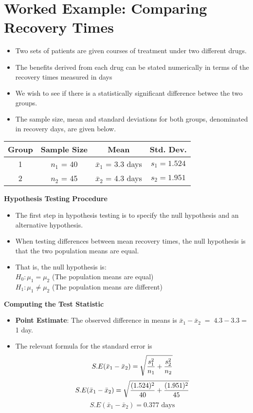 \documentclass[a4paper,12pt]{article}
\begin{document}
\section*{Worked Example: Comparing Recovery Times}
\begin{itemize}
\item Two sets of patients are given courses of treatment under two different drugs. \item 
The benefits
derived from each drug can be stated numerically in terms of the recovery times measured in days
\item We wish to see if there is a statistically significant difference betwee the two groups.
\item The sample size, mean and standard deviations for both groups, denominated in recovery days, are given below.
\end{itemize}
\begin{center}
 \begin{tabular}{|c|c|c|c|}
\hline Group & Sample Size & Mean & Std. Dev.  \\ 
\hline 1 & $n_1$ = 40 & $\bar{x}_1$ = 3.3 days  &  $s_1 = 1.524$ \\ 
\hline 2 & $n_2$ = 45 & $\bar{x}_2$ = 4.3 days & $s_2 = 1.951 $ \\ 
\hline 
\end{tabular} 

   
\end{center}


\noindent \textbf{Hypothesis Testing Procedure}
\begin{itemize}
\item
The first step in hypothesis testing is to specify the null hypothesis and an alternative hypothesis.
\item When testing differences between mean recovery times, the null hypothesis is that the two population means are equal.
\item That is, the null hypothesis is:\\
$H_0: \mu_1 = \mu_2$ (The population means are equal)\\
$H_1: \mu_1 \neq \mu_2$ (The population means are different)\\
\end{itemize}


\noindent \textbf{Computing the Test Statistic}
\begin{itemize}
\item \textbf{Point Estimate}: The observed difference in means is $\bar{x}_1-\bar{x}_2 \;= \;4.3-3.3 \;$= 1 day.
\vspace{0.2cm}
\item The relevant formula for the standard error is
\[ S.E(\bar{x}_1 - \bar{x}_2) = \sqrt{{s^2_1\over n_1}+{s^2_2 \over n_2}} \]
\[ S.E(\bar{x}_1 - \bar{x}_2) = \sqrt{{(1.524)^2 \over 40}+{(1.951)^2 \over 45}}   \]\vspace{0.2cm}
\[ S.E(\bar{x}_1 - \bar{x}_2) = 0.377\mbox{ days}\]
\end{itemize}
\end{document}
